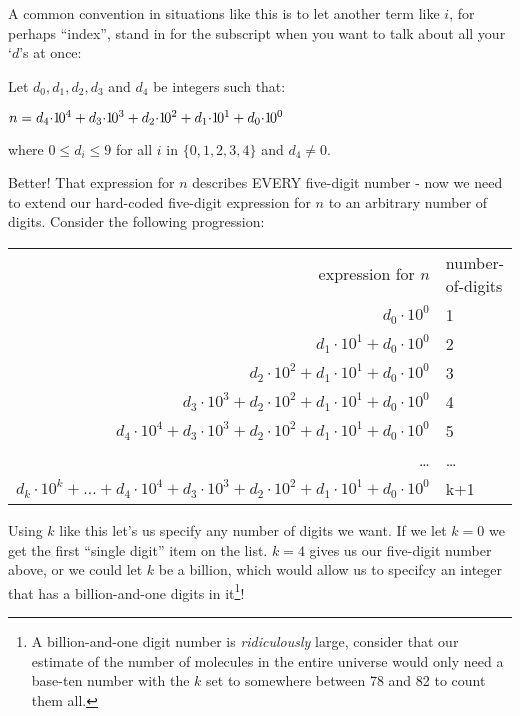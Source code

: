 \documentclass{article}
\newenvironment{jprIn}{\begin{adjustwidth}{2em}{}}{\end{adjustwidth}}
\begin{document}
A common convention in situations like this
is to let another term like $i$, for perhaps ``index'', stand in for the subscript
when you want to talk about all your `$d$'s at once:
\begin{jprIn}
Let $d_0, d_1, d_2,d_3$ and $d_4$ be integers such that:

\hspace{3em}$n=d_4{\cdot}{1\hspace{-0.12em}0}^4+d_3{\cdot}{1\hspace{-0.12em}0}^3+d_2{\cdot}{1\hspace{-0.12em}0}^2+d_1{\cdot}{1\hspace{-0.12em}0}^1+d_0{\cdot}{1\hspace{-0.12em}0}^0$

where $0\le{}d_i\le{}9$ for all $i$ in $\{0,1,2,3,4\}$ and $d_4\ne0$.
\end{jprIn}

Better! That expression for $n$ describes EVERY five-digit number - now we need to extend
our hard-coded five-digit expression for $n$ to an arbitrary
number of digits.
Consider the following progression:
\begin{center}
\begin{tabular}{r l}
expression for $n$ & number-of-digits\\
$d_0{\cdot}10^0$ & 1\\
$d_1{\cdot}10^1+d_0{\cdot}10^0$ & 2\\
$d_2{\cdot}10^2+d_1{\cdot}10^1+d_0{\cdot}10^0$ & 3\\
$d_3{\cdot}10^3+d_2{\cdot}10^2+d_1{\cdot}10^1+d_0{\cdot}10^0$ & 4\\
$d_4{\cdot}10^4+d_3{\cdot}10^3+d_2{\cdot}10^2+d_1{\cdot}10^1+d_0{\cdot}10^0$ & 5\\
\dots{} & \dots{}\\
$d_k{\cdot}10^k+\dots{}+d_4{\cdot}10^4+d_3{\cdot}10^3+d_2{\cdot}10^2+d_1{\cdot}10^1+d_0{\cdot}10^0$ & k+1
\end{tabular}
\end{center}
Using $k$ like this let's us specify any number of digits we want.
If we let $k=0$ we get the first ``single digit'' 
item on the list.  $k=4$ gives us our five-digit number above,
or we could let $k$ be a billion, which would allow
us to specifcy an integer that has a billion-and-one
digits in it\footnote{A billion-and-one digit number is 
\emph{ridiculously} large,
consider that our estimate of the number of molecules in
the entire universe would only need a base-ten
number with the $k$ set to somewhere between 78 and 82 to count them all.}!
\end{document}
